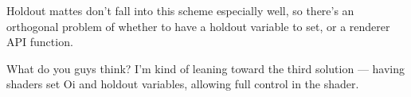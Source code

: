 \documentclass[11pt,letterpaper]{book}
\begin{document}
\begin{annotate}
\begin{itemize}
  Holdout mattes don't fall into this scheme especially well, so there's
  an orthogonal problem of whether to have a {\cf holdout} variable to
  set, or a renderer API function.
\end{itemize}

What do you guys think?  I'm kind of leaning toward the third solution
--- having shaders set {\cf Oi} and {\cf holdout} variables, allowing
full control in the shader.

\end{annotate}
\end{document}
